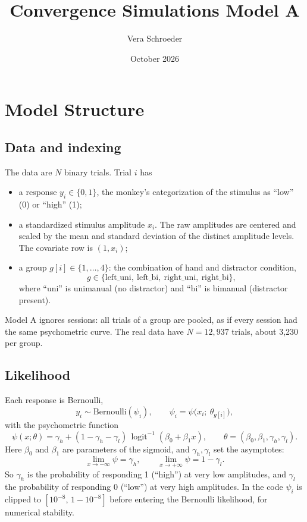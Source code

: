 \documentclass[11pt]{article}
\title{Convergence Simulations Model A}
\author{Vera Schroeder}
\date{October 2026}
\newcommand{\invlogit}{\operatorname{logit}^{-1}}
\begin{document}
\maketitle


\section{Model Structure}
\subsection{Data and indexing}
The data are $N$ binary trials. Trial $i$ has
\begin{itemize}
  \item a response $y_i \in \{0,1\}$, the monkey's categorization of the stimulus as ``low'' (0) or ``high'' (1);
  \item a standardized stimulus amplitude $x_i$. The raw amplitudes are centered and scaled by the mean and standard deviation of the distinct amplitude levels. The covariate row is
        $(1, x_i)$;
  \item a group $g[i] \in \{1,\dots,4\}$: the combination of
        hand and distractor condition,
        \[
          g \in \{\text{left\_uni},\ \text{left\_bi},\ \text{right\_uni},\ \text{right\_bi}\},
        \]
        where ``uni'' is unimanual (no distractor) and ``bi'' is bimanual
        (distractor present).
\end{itemize}
Model A ignores sessions: all trials of a group are pooled, as if every session
had the same psychometric curve. The real data have $N = 12{,}937$ trials, about
3{,}230 per group.

\subsection{Likelihood}

Each response is Bernoulli,
\[
  y_i \sim \text{Bernoulli}(\psi_i), \qquad
  \psi_i = \psi\big(x_i;\ \theta_{g[i]}\big),
\]
with the psychometric function
\[
  \psi(x;\theta) = \gamma_h + (1 - \gamma_h - \gamma_l)\,\invlogit(\beta_0 + \beta_1 x),
  \qquad \theta = (\beta_0, \beta_1, \gamma_h, \gamma_l).
\]
Here $\beta_0$ and $\beta_1$ are parameters of the sigmoid, and $\gamma_h,\gamma_l$
set the asymptotes:
\[
  \lim_{x\to-\infty}\psi = \gamma_h, \qquad \lim_{x\to+\infty}\psi = 1-\gamma_l .
\]
So $\gamma_h$ is the probability of responding 1 (``high'') at very low amplitudes, and
$\gamma_l$ the probability of responding 0 (``low'') at very high amplitudes. In the code
$\psi_i$ is clipped to $[10^{-8},\,1-10^{-8}]$ before entering the Bernoulli
likelihood, for numerical stability.
\end{document}
